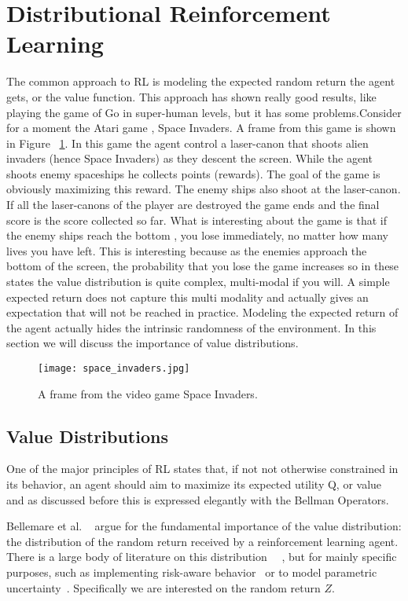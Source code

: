 \section{Distributional Reinforcement Learning} \label{distributional_rl_section}
The common approach to RL is modeling the expected random return the agent gets, or the value function. This approach has shown really good results, like playing the game of Go in super-human levels, but it has some  problems.Consider for a moment the Atari game , Space Invaders. A frame from this game is shown in Figure ~\ref{fig:space_invaders}. In this game the agent control a laser-canon that shoots alien invaders (hence Space Invaders) as they descent the screen. While the agent shoots enemy spaceships he collects points (rewards). The goal of the game is obviously maximizing this reward. The enemy ships also shoot at the laser-canon. If all the laser-canons of the player are destroyed the game ends and the final score is the score collected so far. What is interesting about the game is that if the enemy ships reach the bottom , you lose immediately, no matter how many lives you have left. This is interesting because as the enemies approach the bottom of the screen, the probability that you lose the game increases so in these states the value distribution is quite complex, multi-modal if you will. A simple expected return does not capture this multi modality and actually gives an expectation that will not be reached in practice. Modeling the expected return of the agent actually hides the intrinsic randomness of the environment. In this section we will discuss the importance of value distributions.
\begin{figure}
  \texttt{[image: space\_invaders.jpg]}
  \caption{A frame from the video game Space Invaders.}
  \label{fig:space_invaders}
\end{figure}
\subsection{Value Distributions}
One of the major principles of RL states that, if not not otherwise constrained in its behavior, an agent should aim to maximize its expected utility Q, or value~\cite{Sutton:1998:IRL:551283} and as discussed before this is expressed elegantly with the Bellman Operators.\par
Bellemare et al. ~\cite{DBLP:journals/corr/BellemareDM17} argue for the fundamental importance of the value distribution:  the distribution of the random return received by a reinforcement learning  agent. There is a large body of literature on this distribution~\cite{jaquette1973}~\cite{articleSobel} , but for mainly specific purposes, such as implementing risk-aware behavior~\cite{Morimura:2010:NRD:3104322.3104424} or to model parametric uncertainty~\cite{Dearden98bayesianq-learning}. Specifically we are interested on the random return $Z$.\par
